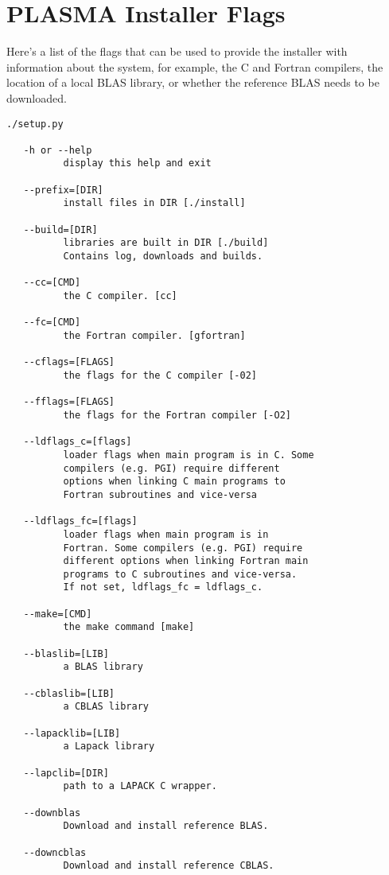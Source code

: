 \section{PLASMA Installer Flags}

Here's a list of the flags that can be used to provide the installer
with information about the system, for example, the C and Fortran
compilers, the location of a local BLAS library, or whether the
reference BLAS needs to be downloaded.

\begin{verbatim}
./setup.py

   -h or --help
          display this help and exit

   --prefix=[DIR] 
          install files in DIR [./install]

   --build=[DIR] 
          libraries are built in DIR [./build]
          Contains log, downloads and builds.

   --cc=[CMD] 
          the C compiler. [cc]

   --fc=[CMD] 
          the Fortran compiler. [gfortran]

   --cflags=[FLAGS] 
          the flags for the C compiler [-02]

   --fflags=[FLAGS] 
          the flags for the Fortran compiler [-O2]

   --ldflags_c=[flags] 
          loader flags when main program is in C. Some
          compilers (e.g. PGI) require different
          options when linking C main programs to
          Fortran subroutines and vice-versa

   --ldflags_fc=[flags] 
          loader flags when main program is in
          Fortran. Some compilers (e.g. PGI) require
          different options when linking Fortran main
          programs to C subroutines and vice-versa.
          If not set, ldflags_fc = ldflags_c.

   --make=[CMD] 
          the make command [make]

   --blaslib=[LIB] 
          a BLAS library

   --cblaslib=[LIB] 
          a CBLAS library

   --lapacklib=[LIB] 
          a Lapack library

   --lapclib=[DIR] 
          path to a LAPACK C wrapper.

   --downblas 
          Download and install reference BLAS.

   --downcblas 
          Download and install reference CBLAS.


\end{verbatim}
